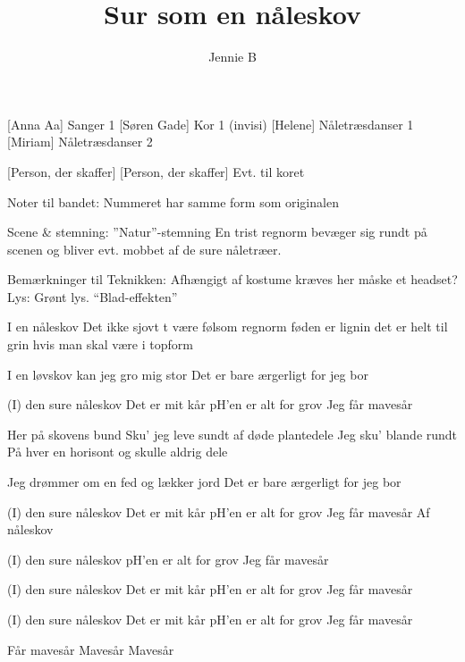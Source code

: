 \documentclass[a4paper,11pt]{article}
\title{Sur som en nåleskov}
\author{Jennie B}
\begin{document}
\maketitle

\begin{roles}
    [Anna Aa] Sanger 1
    [Søren Gade] Kor 1 (invisi)
    [Helene] Nåletræsdanser 1
    [Miriam] Nåletræsdanser 2
\end{roles}

\begin{props}
    [Person, der skaffer] 
    [Person, der skaffer] Evt. til koret
\end{props}


\scene
Noter til bandet:
Nummeret har samme form som originalen


Scene \& stemning:
”Natur”-stemning
En trist regnorm bevæger sig rundt på scenen og bliver evt. mobbet af de sure nåletræer.

Bemærkninger til Teknikken:
Afhængigt af kostume kræves her måske et headset? \\
Lys: Grønt lys. ``Blad-effekten''


\begin{song}
I en nåleskov
Det ikke sjovt
t være følsom regnorm
føden er lignin
det er helt til grin
hvis man skal være i topform

I en løvskov kan jeg gro mig stor
Det er bare ærgerligt for jeg bor

(I) den sure nåleskov
Det er mit kår
pH’en er alt for grov
Jeg får mavesår

Her på skovens bund
Sku' jeg leve sundt
af døde plantedele
Jeg sku' blande rundt
På hver en horisont
og skulle aldrig dele

Jeg drømmer om en fed og lækker jord
Det er bare ærgerligt for jeg bor

(I) den sure nåleskov
Det er mit kår
pH’en er alt for grov
Jeg får mavesår
Af nåleskov


(I) den sure nåleskov
pH’en er alt for grov
Jeg får mavesår

(I) den sure nåleskov
Det er mit kår
pH’en er alt for grov
Jeg får mavesår

(I) den sure nåleskov
Det er mit kår
pH’en er alt for grov
Jeg får mavesår


Får mavesår
Mavesår
Mavesår

\end{song}
\end{document}
